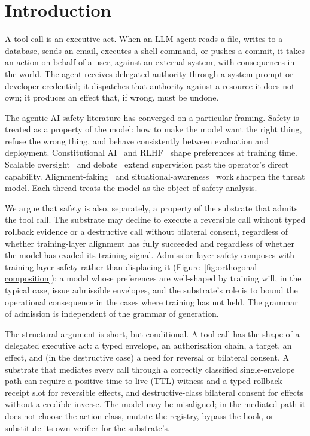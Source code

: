 \section{Introduction}
\label{sec:intro}

A tool call is an executive act. When an LLM agent reads a file, writes to a database, sends an email, executes a shell command, or pushes a commit, it takes an action on behalf of a user, against an external system, with consequences in the world. The agent receives delegated authority through a system prompt or developer credential; it dispatches that authority against a resource it does not own; it produces an effect that, if wrong, must be undone.

The agentic-AI safety literature has converged on a particular framing. Safety is treated as a property of the model: how to make the model want the right thing, refuse the wrong thing, and behave consistently between evaluation and deployment. Constitutional AI~\cite{baiConstitutionalAI2022} and RLHF~\cite{ouyangRLHF2022} shape preferences at training time. Scalable oversight~\cite{leikeScalableOversight2018,bowmanScalableOversight2022} and debate~\cite{christianoDebate2018} extend supervision past the operator's direct capability. Alignment-faking~\cite{hubingerAlignmentFaking2024} and situational-awareness~\cite{berglundSituationalAwareness2023} work sharpen the threat model. Each thread treats the model as the object of safety analysis.

We argue that safety is also, separately, a property of the substrate that admits the tool call. The substrate may decline to execute a reversible call without typed rollback evidence or a destructive call without bilateral consent, regardless of whether training-layer alignment has fully succeeded and regardless of whether the model has evaded its training signal. Admission-layer safety composes with training-layer safety rather than displacing it (Figure~\ref{fig:orthogonal-composition}): a model whose preferences are well-shaped by training will, in the typical case, issue admissible envelopes, and the substrate's role is to bound the operational consequence in the cases where training has not held. The grammar of admission is independent of the grammar of generation.

The structural argument is short, but conditional. A tool call has the shape of a delegated executive act: a typed envelope, an authorisation chain, a target, an effect, and (in the destructive case) a need for reversal or bilateral consent. A substrate that mediates every call through a correctly classified single-envelope path can require a positive time-to-live (TTL) witness and a typed rollback receipt slot for reversible effects, and destructive-class bilateral consent for effects without a credible inverse. The model may be misaligned; in the mediated path it does not choose the action class, mutate the registry, bypass the hook, or substitute its own verifier for the substrate's.

